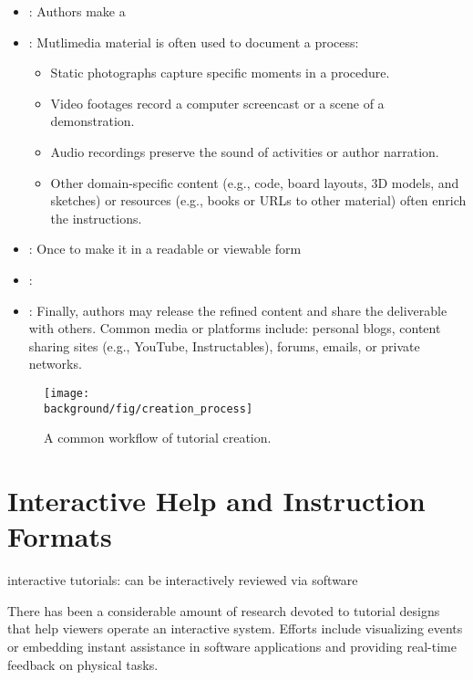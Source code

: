 \begin{itemize}
  \item {}:
    Authors make a
  \item {}:
    Mutlimedia material is often used to document a process:
    \begin{itemize}
      \itemsep -2pt
      \item Static photographs capture specific moments in a procedure.
      \item Video footages record a computer screencast or a scene of a demonstration.
      \item Audio recordings preserve the sound of activities or author narration.
      \item Other domain-specific content (e.g., code, board layouts, 3D models, and sketches) or resources (e.g., books or URLs to other material) often enrich the instructions.
    \end{itemize}
  \item {}:
    Once  to make it in a readable or viewable form
  \item {}:
  \item {}:
    Finally, authors may release the refined content and share the deliverable with others. Common media or platforms include: personal blogs, content sharing sites (e.g., YouTube, Instructables), forums, emails, or private networks.
\end{itemize}

\begin{figure*}[t]
  \centering
  \texttt{[image: \\background/fig/creation\_process]}
  \caption{A common workflow of tutorial creation. }
  \label{fig:background_creation}
\end{figure*}


\section{Interactive Help and Instruction Formats}
\label{background_format}

interactive tutorials: can be interactively reviewed via software

There has been a considerable amount of research devoted to tutorial designs that help viewers operate an interactive system. Efforts include visualizing events or embedding instant assistance in software applications and providing real-time feedback on physical tasks.

